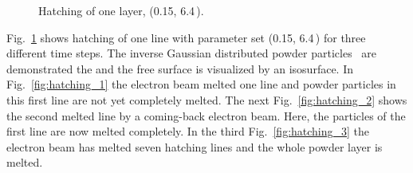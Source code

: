 \begin{figure}[htpb]
\vspace{-15pt}
\centering
   \hspace{2ex}
   \hspace{2ex}
  \hspace{2ex}
 \vspace{-13pt}
\caption{Hatching of one layer, (0.15, 6.4\,).}
\label{fig:Hatching}
\vspace{-15pt}
\end{figure}
Fig.~\ref{fig:Hatching} shows hatching of one line with parameter set (0.15, 6.4\,) for three 
different time steps. The inverse Gaussian distributed powder particles~\cite{Ammer2013} are demonstrated the  and the free surface is visualized by an isosurface. 
In Fig.~\ref{fig:hatching_1} the electron beam melted one line and powder particles in this first line are not yet completely melted. 
The next Fig.~\ref{fig:hatching_2} shows the second melted line by a coming-back 
electron beam. Here, the particles of the first line are now melted completely. In the third Fig.~\ref{fig:hatching_3} the electron beam has melted 
seven hatching lines and the whole powder layer is melted. 
%